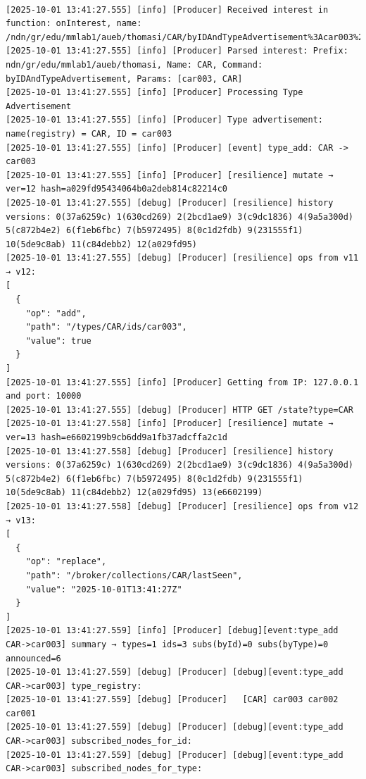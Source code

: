 \documentclass{article}
\begin{document}
\begin{lstlisting}[language=log, caption={SeEDS Service logs after publishing through the \emph{MMLab2} node to \textit{@type=CAR} registry}, label={lst:producer-seeds-service-logs-after-publish-through-mmlab2}] 

[2025-10-01 13:41:27.555] [info] [Producer] Received interest in function: onInterest, name: /ndn/gr/edu/mmlab1/aueb/thomasi/CAR/byIDAndTypeAdvertisement%3Acar003%26CAR
[2025-10-01 13:41:27.555] [info] [Producer] Parsed interest: Prefix: ndn/gr/edu/mmlab1/aueb/thomasi, Name: CAR, Command: byIDAndTypeAdvertisement, Params: [car003, CAR]
[2025-10-01 13:41:27.555] [info] [Producer] Processing Type Advertisement
[2025-10-01 13:41:27.555] [info] [Producer] Type advertisement: name(registry) = CAR, ID = car003
[2025-10-01 13:41:27.555] [info] [Producer] [event] type_add: CAR -> car003
[2025-10-01 13:41:27.555] [info] [Producer] [resilience] mutate → ver=12 hash=a029fd95434064b0a2deb814c82214c0
[2025-10-01 13:41:27.555] [debug] [Producer] [resilience] history versions: 0(37a6259c) 1(630cd269) 2(2bcd1ae9) 3(c9dc1836) 4(9a5a300d) 5(c872b4e2) 6(f1eb6fbc) 7(b5972495) 8(0c1d2fdb) 9(231555f1) 10(5de9c8ab) 11(c84debb2) 12(a029fd95) 
[2025-10-01 13:41:27.555] [debug] [Producer] [resilience] ops from v11 → v12:
[
  {
    "op": "add",
    "path": "/types/CAR/ids/car003",
    "value": true
  }
]
[2025-10-01 13:41:27.555] [info] [Producer] Getting from IP: 127.0.0.1 and port: 10000
[2025-10-01 13:41:27.555] [debug] [Producer] HTTP GET /state?type=CAR
[2025-10-01 13:41:27.558] [info] [Producer] [resilience] mutate → ver=13 hash=e6602199b9cb6dd9a1fb37adcffa2c1d
[2025-10-01 13:41:27.558] [debug] [Producer] [resilience] history versions: 0(37a6259c) 1(630cd269) 2(2bcd1ae9) 3(c9dc1836) 4(9a5a300d) 5(c872b4e2) 6(f1eb6fbc) 7(b5972495) 8(0c1d2fdb) 9(231555f1) 10(5de9c8ab) 11(c84debb2) 12(a029fd95) 13(e6602199) 
[2025-10-01 13:41:27.558] [debug] [Producer] [resilience] ops from v12 → v13:
[
  {
    "op": "replace",
    "path": "/broker/collections/CAR/lastSeen",
    "value": "2025-10-01T13:41:27Z"
  }
]
[2025-10-01 13:41:27.559] [info] [Producer] [debug][event:type_add CAR->car003] summary → types=1 ids=3 subs(byId)=0 subs(byType)=0 announced=6
[2025-10-01 13:41:27.559] [debug] [Producer] [debug][event:type_add CAR->car003] type_registry:
[2025-10-01 13:41:27.559] [debug] [Producer]   [CAR] car003 car002 car001 
[2025-10-01 13:41:27.559] [debug] [Producer] [debug][event:type_add CAR->car003] subscribed_nodes_for_id:
[2025-10-01 13:41:27.559] [debug] [Producer] [debug][event:type_add CAR->car003] subscribed_nodes_for_type:

\end{lstlisting}
\end{document}
